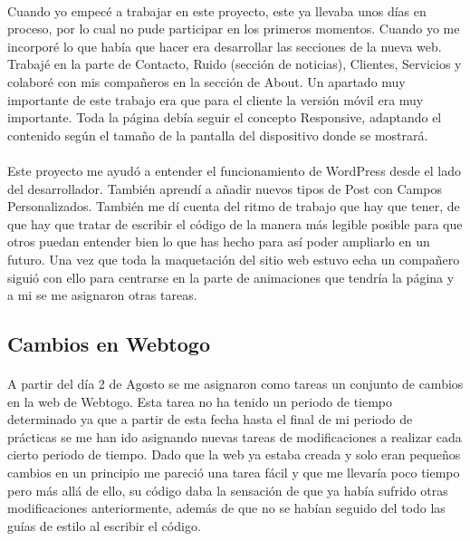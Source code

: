 \documentclass[10pt, a4paper,spanish]{article}
\begin{document}
            \paragraph{}
            Cuando yo empecé a trabajar en este proyecto, este ya llevaba unos días en proceso, por lo cual no pude participar en los primeros momentos. Cuando yo me incorporé lo que había que hacer era desarrollar las  secciones de la nueva web. Trabajé en la parte de Contacto, Ruido (sección de noticias), Clientes, Servicios y colaboré con mis compañeros en  la sección de About. Un apartado muy importante de este trabajo era que para el cliente la versión móvil era muy importante. Toda la página debía seguir el concepto Responsive, adaptando el contenido según el tamaño de la pantalla del dispositivo donde se mostrará.

            \paragraph{}
            Este proyecto me ayudó a entender el funcionamiento de WordPress desde el lado del desarrollador. También aprendí a añadir nuevos tipos de Post con Campos Personalizados. También me dí cuenta del ritmo de trabajo que hay que tener, de que hay que tratar de escribir el código de la manera más legible posible para que otros puedan entender bien lo que has hecho para así poder ampliarlo en un futuro. Una vez que toda la maquetación del sitio web estuvo echa un compañero siguió con ello para centrarse en la parte de animaciones que tendría la página y a mi se me asignaron otras tareas.


        \subsection{Cambios en Webtogo}

            \paragraph{}
            A partir del día 2 de Agosto se me asignaron como tareas un conjunto de cambios en la web de Webtogo. Esta tarea no ha tenido un periodo de tiempo determinado ya que a partir de esta fecha hasta el final de mi periodo de prácticas se me han ido asignando nuevas tareas de modificaciones a realizar cada cierto periodo de tiempo. Dado que la web ya estaba creada y solo eran pequeños cambios en un principio me pareció una tarea fácil y que me llevaría poco tiempo pero más allá de ello, su código daba la sensación de que ya había sufrido otras modificaciones anteriormente, además de que no se habían seguido del todo las guías de estilo al escribir el código.
\end{document}
